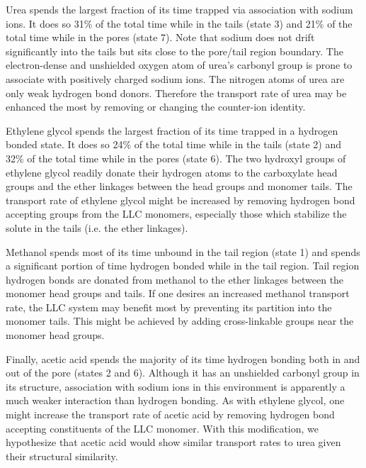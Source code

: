 \documentclass[aps,pre,preprint,groupedaddress,longbibliography]{revtex4-2}
\begin{document}
  Urea spends the largest fraction of its time trapped via association with sodium ions.
  It does so 31\% of the total time while in the tails (state 3) and 21\% of the
  total time while in the pores (state 7). Note that sodium does not drift significantly 
  into the tails but sits close to the pore/tail region boundary. The electron-dense 
  and unshielded oxygen atom of urea's carbonyl group is prone to associate with 
  positively charged sodium ions. The nitrogen atoms of urea are only weak hydrogen bond
  donors. 
  Therefore the transport rate of urea may be enhanced the most by removing or changing 
  the counter-ion identity.
  
  Ethylene glycol spends the largest fraction of its time trapped in a hydrogen
  bonded state. It does so 24\% of the total time while in the tails (state 2)
  and 32\% of the total time while in the pores (state 6). The two hydroxyl groups 
  of ethylene glycol readily donate their hydrogen atoms to the carboxylate
  head groups and the ether linkages between the head groups and monomer tails.
  The transport rate of ethylene glycol might be increased by removing hydrogen 
  bond accepting groups from the LLC monomers, especially those which stabilize
  the solute in the tails (i.e. the ether linkages). 
  
  Methanol spends most of its time unbound in the tail region (state 1) and spends a 
  significant portion of time hydrogen bonded while in the tail region.
  Tail region hydrogen bonds are donated from methanol to the ether linkages between
  the monomer head groups and tails. 
  If one desires an increased methanol transport 
  rate, the LLC system may benefit most by preventing its partition into the monomer
  tails. This might be achieved by adding cross-linkable groups near the monomer
  head groups.
  
  Finally, acetic acid spends the majority of its time hydrogen bonding both in and out
  of the pore (states 2 and 6). Although it has an unshielded carbonyl group in its
  structure, association with sodium ions in this environment is apparently a much 
  weaker interaction than hydrogen bonding. 
  As with ethylene glycol, one might increase
  the transport rate of acetic acid by removing hydrogen bond accepting constituents
  of the LLC monomer. With this modification, we hypothesize that acetic acid would 
  show similar transport rates to urea given their structural similarity.
  
\end{document}
